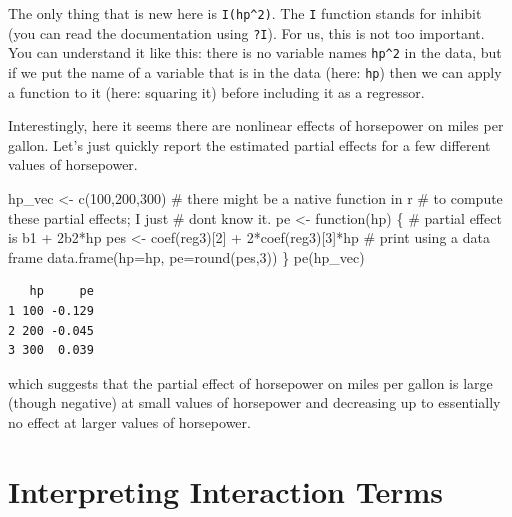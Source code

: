 \documentclass[
  letterpaper,
  DIV=11,
  numbers=noendperiod]{scrreprt}
\newenvironment{Shaded}{\begin{snugshade}}{\end{snugshade}}
\newcommand{\AttributeTok}[1]{\textcolor[rgb]{0.40,0.45,0.13}{#1}}
\newcommand{\CommentTok}[1]{\textcolor[rgb]{0.37,0.37,0.37}{#1}}
\newcommand{\ControlFlowTok}[1]{\textcolor[rgb]{0.00,0.23,0.31}{#1}}
\newcommand{\DecValTok}[1]{\textcolor[rgb]{0.68,0.00,0.00}{#1}}
\newcommand{\FunctionTok}[1]{\textcolor[rgb]{0.28,0.35,0.67}{#1}}
\newcommand{\NormalTok}[1]{\textcolor[rgb]{0.00,0.23,0.31}{#1}}
\newcommand{\OtherTok}[1]{\textcolor[rgb]{0.00,0.23,0.31}{#1}}
\newcommand{\SpecialCharTok}[1]{\textcolor[rgb]{0.37,0.37,0.37}{#1}}
\begin{document}
The only thing that is new here is \texttt{I(hp\^{}2)}. The \texttt{I}
function stands for inhibit (you can read the documentation using
\texttt{?I}). For us, this is not too important. You can understand it
like this: there is no variable names \texttt{hp\^{}2} in the data, but
if we put the name of a variable that is in the data (here: \texttt{hp})
then we can apply a function to it (here: squaring it) before including
it as a regressor.

Interestingly, here it seems there are nonlinear effects of horsepower
on miles per gallon. Let's just quickly report the estimated partial
effects for a few different values of horsepower.

\begin{Shaded}
\begin{Highlighting}[]
\NormalTok{hp\_vec }\OtherTok{\textless{}{-}} \FunctionTok{c}\NormalTok{(}\DecValTok{100}\NormalTok{,}\DecValTok{200}\NormalTok{,}\DecValTok{300}\NormalTok{)}
\CommentTok{\# there might be a native function in r}
\CommentTok{\# to compute these partial effects; I just}
\CommentTok{\# don\textquotesingle{}t know it.}
\NormalTok{pe }\OtherTok{\textless{}{-}} \ControlFlowTok{function}\NormalTok{(hp) \{}
  \CommentTok{\# partial effect is b1 + 2b2*hp}
\NormalTok{  pes }\OtherTok{\textless{}{-}} \FunctionTok{coef}\NormalTok{(reg3)[}\DecValTok{2}\NormalTok{] }\SpecialCharTok{+} \DecValTok{2}\SpecialCharTok{*}\FunctionTok{coef}\NormalTok{(reg3)[}\DecValTok{3}\NormalTok{]}\SpecialCharTok{*}\NormalTok{hp}
  \CommentTok{\# print using a data frame}
  \FunctionTok{data.frame}\NormalTok{(}\AttributeTok{hp=}\NormalTok{hp, }\AttributeTok{pe=}\FunctionTok{round}\NormalTok{(pes,}\DecValTok{3}\NormalTok{))}
\NormalTok{\}}
\FunctionTok{pe}\NormalTok{(hp\_vec)}
\end{Highlighting}
\end{Shaded}

\begin{verbatim}
   hp     pe
1 100 -0.129
2 200 -0.045
3 300  0.039
\end{verbatim}

which suggests that the partial effect of horsepower on miles per gallon
is large (though negative) at small values of horsepower and decreasing
up to essentially no effect at larger values of horsepower.

\section{Interpreting Interaction
Terms}\label{interpreting-interaction-terms}
\end{document}
